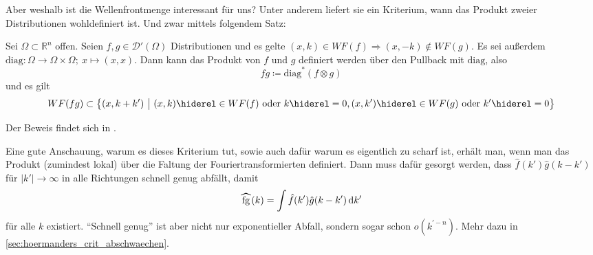 Aber weshalb ist die Wellenfrontmenge interessant für uns? Unter anderem liefert sie ein Kriterium, wann das Produkt zweier Distributionen wohldefiniert ist. Und zwar mittels folgendem Satz:

\begin{theorem}
\label{thm:hoermanders_criterion}
    Sei $\Omega \subset \mathbb{R}^n$ offen.
    Seien $f,g \in \mathcal{D}'(\Omega)$ Distributionen und es gelte $(x,k) \in WF(f) \Rightarrow (x,-k) \notin WF(g)$. Es sei außerdem $\mathrm{diag} : \Omega \rightarrow \Omega \times \Omega; ~x \mapsto (x,x)$. Dann kann das Produkt von $f$ und $g$ definiert werden über den Pullback mit $\mathrm{diag}$, also
    \begin{equation*}
        f g \coloneqq \mathrm{diag}^* (f \otimes g)
    \end{equation*}
    und es gilt
    \begin{dmath*}
        WF(fg) \subset \left\{(x,k+k') ~\big|~ (x,k) \hiderel\in WF(f) \textrm{ oder } k \hiderel = 0,\\ (x,k') \hiderel\in WF(g) \textrm{ oder } k'\hiderel=0 \right\}
    \end{dmath*}
\end{theorem}

Der Beweis findet sich in \textcite{Hoermander1985}.

Eine gute Anschauung, warum es dieses Kriterium tut, sowie auch dafür warum es eigentlich zu scharf ist, erhält man, wenn man das Produkt (zumindest lokal) über die Faltung der Fouriertransformierten definiert. Dann muss dafür gesorgt werden, dass $\hat f(k') \hat g(k-k')$ für $|k'| \to \infty$ in alle Richtungen schnell genug abfällt, damit
\begin{equation*}
    \rwhat{fg}(k) = \int \hat f(k') \hat g(k-k') \d k'
\end{equation*}
für alle $k$ existiert. "`Schnell genug"' ist aber nicht nur exponentieller Abfall, sondern sogar schon $o(k^{\prime -n})$. Mehr dazu in \cref{sec:hoermanders_crit_abschwaechen}.


